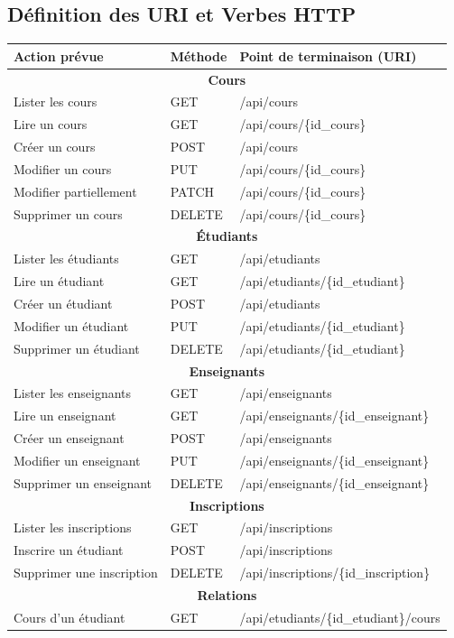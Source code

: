 \documentclass[12pt]{article}
\begin{document}
\subsection{Définition des URI et Verbes HTTP}
\begin{center}
\renewcommand{\arraystretch}{1.8}
\begin{tabularx}{\textwidth}{|l|l|X|}
\hline
\rowcolor{orange!5!white} \textbf{Action prévue} & \textbf{Méthode} & \textbf{Point de terminaison (URI)} \\ \hline
\multicolumn{3}{|c|}{\textbf{Cours}} \\ \hline
Lister les cours & GET & /api/cours \\ \hline
Lire un cours & GET & /api/cours/\{id\_cours\} \\ \hline
Créer un cours & POST & /api/cours \\ \hline
Modifier un cours & PUT & /api/cours/\{id\_cours\} \\ \hline
Modifier partiellement & PATCH & /api/cours/\{id\_cours\} \\ \hline
Supprimer un cours & DELETE & /api/cours/\{id\_cours\} \\ \hline
\multicolumn{3}{|c|}{\textbf{Étudiants}} \\ \hline
Lister les étudiants & GET & /api/etudiants \\ \hline
Lire un étudiant & GET & /api/etudiants/\{id\_etudiant\} \\ \hline
Créer un étudiant & POST & /api/etudiants \\ \hline
Modifier un étudiant & PUT & /api/etudiants/\{id\_etudiant\} \\ \hline
Supprimer un étudiant & DELETE & /api/etudiants/\{id\_etudiant\} \\ \hline
\multicolumn{3}{|c|}{\textbf{Enseignants}} \\ \hline
Lister les enseignants & GET & /api/enseignants \\ \hline
Lire un enseignant & GET & /api/enseignants/\{id\_enseignant\} \\ \hline
Créer un enseignant & POST & /api/enseignants \\ \hline
Modifier un enseignant & PUT & /api/enseignants/\{id\_enseignant\} \\ \hline
Supprimer un enseignant & DELETE & /api/enseignants/\{id\_enseignant\} \\ \hline
\multicolumn{3}{|c|}{\textbf{Inscriptions}} \\ \hline
Lister les inscriptions & GET & /api/inscriptions \\ \hline
Inscrire un étudiant & POST & /api/inscriptions \\ \hline
Supprimer une inscription & DELETE & /api/inscriptions/\{id\_inscription\} \\ \hline
\multicolumn{3}{|c|}{\textbf{Relations}} \\ \hline
Cours d'un étudiant & GET & /api/etudiants/\{id\_etudiant\}/cours \\ \hline
\end{tabularx}
\end{center}
\end{document}
